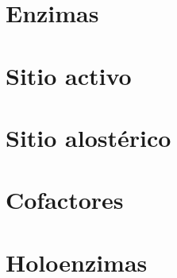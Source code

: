 

\section{Enzimas}



\section{Sitio activo}



\section{Sitio alostérico}



\section{Cofactores}



\section{Holoenzimas}



